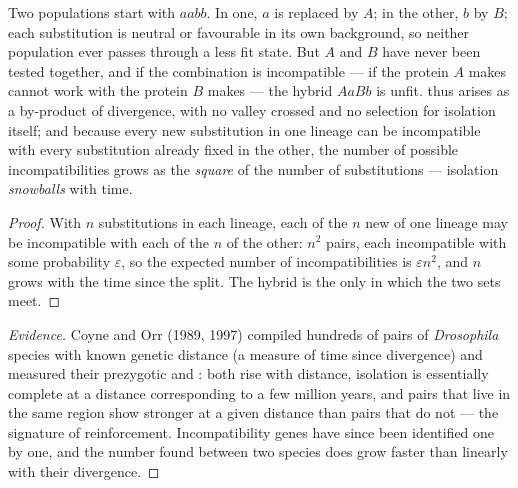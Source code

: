 \begin{theorem}\label{thm:b2:speciation:dm}
Two populations start with  $aabb$. In one, $a$ is replaced
by $A$; in the other, $b$ by $B$; each substitution is neutral or
favourable in its own background, so neither population ever
passes through a less fit state. But $A$ and $B$ have never been
tested together, and if the combination is incompatible --- if the
protein $A$ makes cannot work with the protein $B$ makes --- the
hybrid $AaBb$ is unfit.  thus arises as a
by-product of divergence, with no valley crossed and no selection
for isolation itself; and because every new substitution in one
lineage can be incompatible with every substitution already fixed
in the other, the number of possible incompatibilities grows as the
\emph{square} of the number of substitutions --- isolation
\emph{snowballs} with time.
\end{theorem}
\begin{proof}
With $n$ substitutions in each lineage, each of the $n$ new 
of one lineage may be incompatible with each of the $n$ of the
other: $n^{2}$ pairs, each incompatible with some probability
$\varepsilon$, so the expected number of incompatibilities is
$\varepsilon n^{2}$, and $n$ grows with the time since the split.
The hybrid is the only  in which the two sets meet.
\end{proof}
\begin{proof}[Evidence]
Coyne and Orr (1989, 1997) compiled hundreds of pairs of
\emph{Drosophila} species with known genetic distance (a measure of
time since divergence) and measured their prezygotic and
: both rise with distance, isolation is
essentially complete at a distance corresponding to a few million
years, and pairs that live in the same region show stronger
 at a given distance than pairs that do not ---
the signature of reinforcement. Incompatibility genes have since
been identified one by one, and the number found between two
species does grow faster than linearly with their divergence.
\end{proof}

